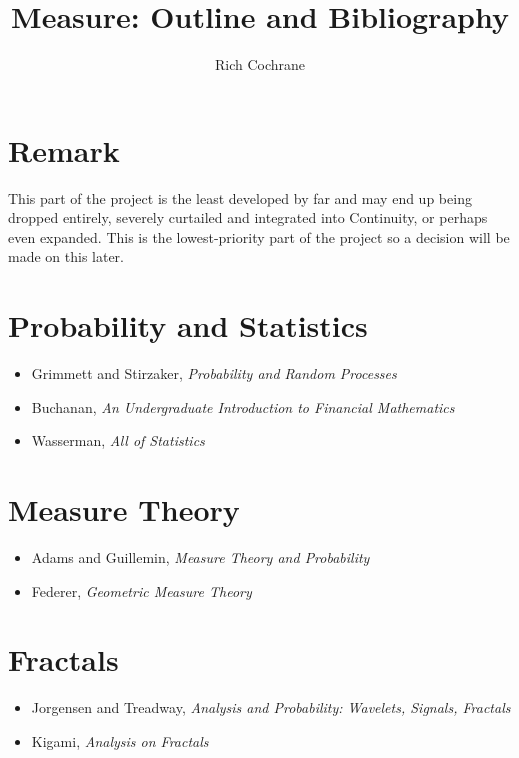 \documentclass[article]{article}
\begin{document}
	
	\title{Measure: Outline and Bibliography}
	\author{Rich Cochrane}
	\maketitle
	
\section*{Remark}

This part of the project is the least developed by far and may end up being dropped entirely, severely curtailed and integrated into Continuity, or perhaps even expanded. This is the lowest-priority part of the project so a decision will be made on this later.

\section{Probability and Statistics}

\begin{itemize}
	\item{Grimmett and Stirzaker, \textit{Probability and Random Processes}}
	\item{Buchanan, \textit{An Undergraduate Introduction to Financial Mathematics}}
	\item{Wasserman, \textit{All of Statistics}}
\end{itemize}

\section{Measure Theory}

\begin{itemize}
	\item{Adams and Guillemin, \textit{Measure Theory and Probability}}
	\item{Federer, \textit{Geometric Measure Theory}}
\end{itemize}

\section{Fractals}

\begin{itemize}
	\item{Jorgensen and Treadway, \textit{Analysis and Probability: Wavelets, Signals, Fractals}}
	\item{Kigami, \textit{Analysis on Fractals}}
\end{itemize}


	
\end{document}
